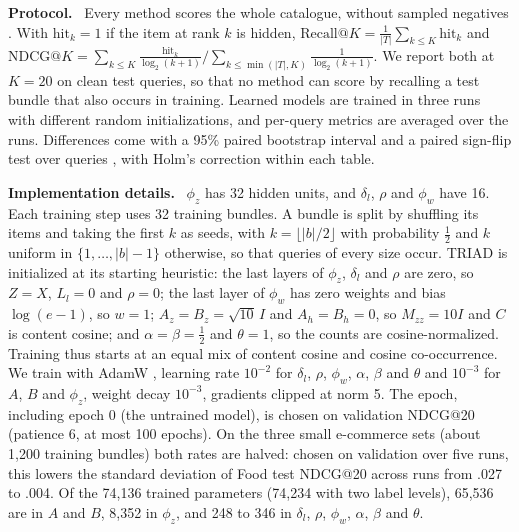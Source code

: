 \documentclass[runningheads]{llncs}
\renewcommand{\paragraph}[1]{\smallskip\noindent\textbf{#1}\ }
\begin{document}
\paragraph{Protocol.} Every method scores the whole catalogue, without sampled negatives \cite{krichene2020}. With
$\mathrm{hit}_k=1$ if the item at rank $k$ is hidden,
$\mathrm{Recall@}K=\frac{1}{|T|}\sum_{k\le K}\mathrm{hit}_k$ and
$\mathrm{NDCG@}K=\sum_{k\le K}\frac{\mathrm{hit}_k}{\log_2(k+1)}\big/\sum_{k\le\min(|T|,K)}\frac{1}{\log_2(k+1)}$.
We report both at $K=20$ on clean test queries, so that no method can score by recalling a test bundle that also
occurs in training. Learned models are trained in three runs with different random initializations, and per-query
metrics are averaged over the runs. Differences come with a 95\% paired bootstrap interval and a paired sign-flip test
over queries \cite{efron1993,smucker2007}, with Holm's correction \cite{holm1979} within each table.

\paragraph{Implementation details.} $\phi_z$ has 32 hidden units, and $\delta_l$, $\rho$ and $\phi_w$ have 16.
Each training step uses 32 training bundles. A bundle is split by shuffling its items and taking the first $k$ as
seeds, with $k=\lfloor|b|/2\rfloor$ with probability $\tfrac12$ and $k$ uniform in $\{1,\dots,|b|-1\}$ otherwise, so
that queries of every size occur. TRIAD is initialized at its starting heuristic: the last layers of $\phi_z$, $\delta_l$ and $\rho$ are zero, so
$Z=X$, $L_l=0$ and $\rho=0$; the last layer of $\phi_w$ has zero weights and bias $\log(e-1)$, so $w=1$;
$A_z=B_z=\sqrt{10}\,I$ and $A_h=B_h=0$, so $M_{zz}=10I$ and $C$ is content cosine; and $\alpha=\beta=\tfrac12$ and
$\theta=1$, so the counts are cosine-normalized. Training thus starts at an equal mix of content cosine and cosine
co-occurrence. We train with AdamW \cite{adamw}, learning rate $10^{-2}$ for
$\delta_l$, $\rho$, $\phi_w$, $\alpha$, $\beta$ and $\theta$ and $10^{-3}$ for $A$, $B$ and $\phi_z$, weight decay
$10^{-3}$, gradients clipped at norm 5. The epoch, including epoch 0 (the untrained model), is chosen on validation
NDCG@20 (patience 6, at most 100 epochs). On the three small e-commerce sets (about 1,200 training bundles) both rates
are halved: chosen on validation over five runs, this lowers the standard deviation of Food test NDCG@20 across runs
from .027 to .004. Of the 74,136 trained parameters (74,234 with two label levels), 65,536 are in $A$ and $B$, 8,352 in $\phi_z$, and 248 to 346 in
$\delta_l$, $\rho$, $\phi_w$, $\alpha$, $\beta$ and $\theta$.
\end{document}
